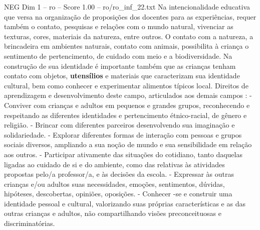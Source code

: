 \begin{textsample}{NEG Dim 1 – ro – Score 1.00 – ro/ro\_inf\_22.txt}
Na intencionalidade educativa que versa na organização de proposições dos docentes para as experiências, requer também o contato, pesquisas e relações com o mundo natural, vivenciar as texturas, cores, materiais da natureza, entre outros.
O contato com a natureza, a brincadeira em ambientes naturais, contato com animais, possibilita à criança o sentimento de pertencimento, de cuidado com meio e a biodiversidade.
Na construção de sua identidade é importante também que as crianças tenham contato com objetos, \textbf{utensílios} e materiais que caracterizam sua identidade cultural, bem como conhecer e experimentar alimentos típicos local.
Direitos de aprendizagem e desenvolvimento deste campo, articulados aos demais campos : - Conviver com crianças e adultos em pequenos e grandes grupos, reconhecendo e respeitando as diferentes identidades e pertencimento étnico-racial, de gênero e religião. - Brincar com diferentes parceiros desenvolvendo sua imaginação e solidariedade. - Explorar diferentes formas de interação com pessoas e grupos sociais diversos, ampliando a sua noção de mundo e sua sensibilidade em relação aos outros. - Participar ativamente das situações do cotidiano, tanto daquelas ligadas ao cuidado de si e do ambiente, como das relativas às atividades propostas pelo/a professor/a, e às decisões da escola. - Expressar às outras crianças e/ou adultos suas necessidades, emoções, sentimentos, dúvidas, hipóteses, descobertas, opiniões, oposições. - Conhecer -se e construir uma identidade pessoal e cultural, valorizando suas próprias características e as das outras crianças e adultos, não compartilhando visões preconceituosas e discriminatórias.

\end{textsample}
